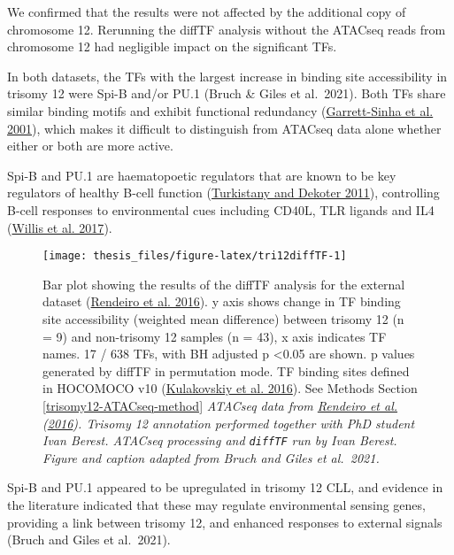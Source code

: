 \documentclass[11pt, a4paper, twosided]{book}
\begin{document}
We confirmed that the results were not affected by the additional copy of chromosome 12. Rerunning the diffTF analysis without the ATACseq reads from chromosome 12 had negligible impact on the significant TFs.

In both datasets, the TFs with the largest increase in binding site accessibility in trisomy 12 were Spi-B and/or PU.1 (Bruch \& Giles et al.~2021). Both TFs share similar binding motifs and exhibit functional redundancy (\protect\hyperlink{ref-GarrettSinha2001}{Garrett-Sinha et al. 2001}), which makes it difficult to distinguish from ATACseq data alone whether either or both are more active.

Spi-B and PU.1 are haematopoetic regulators that are known to be key regulators of healthy B-cell function (\protect\hyperlink{ref-Turkistany2011}{Turkistany and Dekoter 2011}), controlling B-cell responses to environmental cues including CD40L, TLR ligands and IL4 (\protect\hyperlink{ref-Willis2017}{Willis et al. 2017}).


\begin{figure}

{\centering \texttt{[image: thesis\_files/figure-latex/tri12diffTF-1]} 

}

\caption{Bar plot showing the results of the diffTF analysis for the external dataset (\protect\hyperlink{ref-Rendeiro2016}{Rendeiro et al. 2016}). y axis shows change in TF binding site accessibility (weighted mean difference) between trisomy 12 (n = 9) and non-trisomy 12 samples (n = 43), x axis indicates TF names. 17 / 638 TFs, with BH adjusted p \textless0.05 are shown. p values generated by diffTF in permutation mode. TF binding sites defined in HOCOMOCO v10 (\protect\hyperlink{ref-HOCOMOCO}{Kulakovskiy et al. 2016}). See Methods Section \ref{trisomy12-ATACseq-method} \emph{ATACseq data from \protect\hyperlink{ref-Rendeiro2016}{Rendeiro et al.} (\protect\hyperlink{ref-Rendeiro2016}{2016}). Trisomy 12 annotation performed together with PhD student Ivan Berest. ATACseq processing and \texttt{diffTF} run by Ivan Berest. Figure and caption adapted from Bruch and Giles et al.~2021.}}\label{fig:tri12diffTF}
\end{figure}
Spi-B and PU.1 appeared to be upregulated in trisomy 12 CLL, and evidence in the literature indicated that these may regulate environmental sensing genes, providing a link between trisomy 12, and enhanced responses to external signals (Bruch and Giles et al.~2021).
\end{document}
